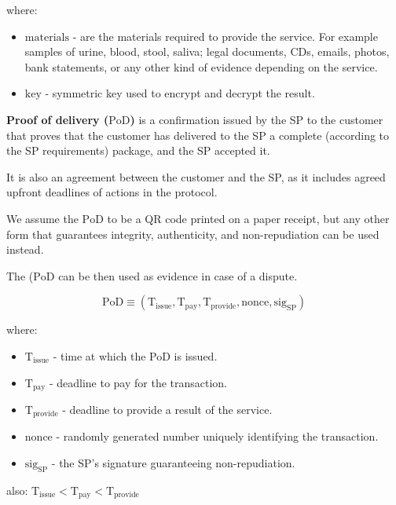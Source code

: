 \documentclass{ieeeaccess}
\begin{document}
where:

\begin{itemize}

\item $\mathrm{materials}$ - are the materials required to provide the service. For example samples of urine, blood, stool, saliva; legal documents, CDs, emails, photos, bank statements, or any other kind of evidence depending on the service.
\item $\mathrm{key}$ - symmetric key used to encrypt and decrypt the result.
\end{itemize}

\noindent \textbf
{Proof of delivery ($\mathrm{PoD}$)}\label{proof-of-delivery} is a  confirmation issued by the SP to the customer that proves that the customer has delivered to the SP a complete (according to the SP requirements) package, and the SP accepted it.

It is also an agreement between the customer and the SP, as it includes agreed upfront deadlines of actions in the protocol.

We assume the $\mathrm{PoD}$ to be a QR code printed on a paper receipt, but any other form that guarantees integrity, authenticity, and non-repudiation can be used instead. 

The ($\mathrm{PoD}$ can be then used as evidence in case of a dispute.

$$\mathrm{PoD} \equiv (\mathrm{T}_\mathrm{issue}, \mathrm{T}_\mathrm{pay}, \mathrm{T}_\mathrm{provide}, \mathrm{nonce}, \mathrm{sig}_\mathrm{SP})$$

where:

\begin{itemize}

\item $\mathrm{T}_\mathrm{issue}$ - time at which the PoD is issued.
\item
  $\mathrm{T}_\mathrm{pay}$ - deadline to pay for the transaction.
\item
  $\mathrm{T}_\mathrm{provide}$ - deadline to provide a result of the service.
\item $\mathrm{nonce}$ - randomly generated number uniquely identifying the transaction.
\item $\mathrm{sig}_\mathrm{SP}$ - the SP's signature guaranteeing non-repudiation.
\end{itemize}

also:
\(\mathrm{T}_\mathrm{issue} < \mathrm{T}_\mathrm{pay} < \mathrm{T}_\mathrm{provide}\)
\end{document}
